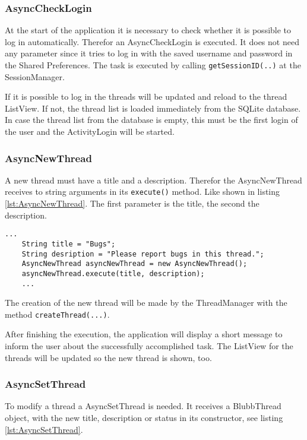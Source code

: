 \documentclass[12pt,a4paper,oneside]{report}
\newcommand{\code}[1]{\lstinline{#1}}
\begin{document}
\subsubsection{AsyncCheckLogin}
\label{AsyncCheckLogin}
At the start of the application it is necessary to check whether it is possible to log in automatically.
Therefor an AsyncCheckLogin is executed. It does not need any parameter since it tries to log in with the saved username and password in the Shared Preferences. 
The task is executed by calling \code{getSessionID(..)} at the SessionManager.


If it is possible to log in the threads will be updated and reload to the thread ListView. If not, the thread list is loaded immediately from the SQLite database. In case the thread list from the database is empty, this must be the first login of the user and the ActivityLogin will be started.

\subsubsection{AsyncNewThread}
\label{subsubsec:AsyncNewThread}
A new thread must have a title and a description. Therefor the AsyncNewThread receives to string arguments in its \code{execute()} method. Like shown in listing \ref{lst:AsyncNewThread}. The first parameter is the title, the second the description. 
\lstset{language=java}
\begin{lstlisting}[caption=AsyncNewThread example, label=lst:AsyncNewThread]
	...
	String title = "Bugs";
	String desription = "Please report bugs in this thread.";
	AsyncNewThread asyncNewThread = new AsyncNewThread();
	asyncNewThread.execute(title, description);
	...
\end{lstlisting}
The creation of the new thread will be made by the ThreadManager with the method \code{createThread(...)}.

After finishing the execution, the application will display a short message to inform the user about the successfully accomplished task. The ListView for the threads will be updated so the new thread is shown, too.

\subsubsection{AsyncSetThread}
\label{subsubsec:AsyncSetThread}
To modify a thread a AsyncSetThread is needed. It receives a BlubbThread object, with the new title, description or status in its constructor, see listing \ref{lst:AsyncSetThread}.
\end{document}
